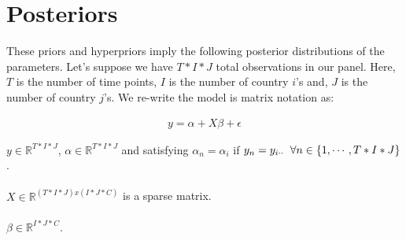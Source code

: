 \documentclass[paper=a4, fontsize=11pt]{scrartcl} %
\numberwithin{equation}{section} %
\numberwithin{figure}{section} %
\numberwithin{table}{section} %
\begin{document}
\section{Posteriors}

These priors and hyperpriors imply the following posterior distributions of the parameters.  Let's suppose we have $T*I*J$ total observations in our panel.  Here, $T$ is the number of time points, $I$ is the number of country $i$'s and, $J$ is the number of country $j$'s.  We re-write the model is matrix notation as:

\begin{align}
	y = \alpha + X\beta + \epsilon
\end{align}

$y \in \mathbb{R}^{T*I*J}$, $\alpha \in \mathbb{R}^{T*I*J}$ and satisfying $\alpha_{n} = \alpha_{i}$ if $y_{n} = y_{i \cdot \cdot} \hspace{2mm} \forall n \in \{1, \cdots, T*I*J\}$.
\\
\\
 $X \in \mathbb{R}^{(T*I*J) x (I*J*C)}$ is a sparse matrix.
\\
\\ 
$\beta \in \mathbb{R}^{I*J*C}$. 
\\
\\
\end{document}

